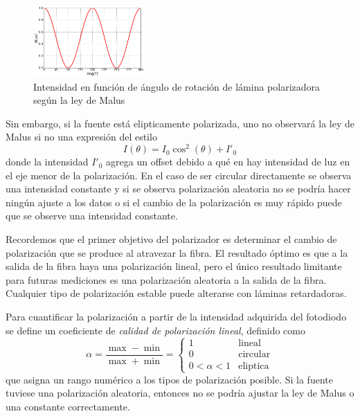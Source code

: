 \begin{figure}[H]
    \centering
    \includegraphics[width=0.38\textwidth]{fig/polarimetro/malus}
    \caption{Intensidad en función de ángulo de rotación de lámina polarizadora según la ley de Malus}
    \label{fig:polarizacion/malus}
\end{figure}

Sin embargo, si la fuente está elipticamente polarizada, uno no observará la ley de Malus si no una expresión del estilo \cite{goldstein_collett}
\begin{equation}
    I(\theta) = I_0 \cos^2(\theta) + I'_0
\end{equation}
donde la intensidad $I'_0$ agrega un offset debido a qué en hay intensidad de luz en el eje menor de la polarización. En el caso de ser circular directamente se observa una intensidad constante y si se observa polarización aleatoria no se podría hacer ningún ajuste a los datos o si el cambio de la polarización es muy rápido puede que se observe una intensidad constante.

Recordemos que el primer objetivo del polarizador es determinar el cambio de polarización que se produce al atravezar la fibra. El resultado óptimo es que a la salida de la fibra haya una polarización lineal, pero el único resultado limitante para futuras mediciones es una polarización aleatoria a la salida de la fibra. Cualquier tipo de polarización estable puede alterarse con láminas retardadoras. 

Para cuantificar la polarización a partir de la intensidad adquirida del fotodiodo se define un coeficiente de \emph{calidad de polarización lineal}, definido como
\begin{equation}
    \alpha = \frac{\max - \min}{\max + \min} = \begin{cases} 1 & \text{lineal} \\ 0 & \text{circular} \\ 0 < \alpha < 1 & \text{eliptica} \end{cases}
    \label{eq:polarizacion/alpha}
\end{equation}
que asigna un rango numérico a los tipos de polarización posible. Si la fuente tuviese una polarización aleatoria, entonces no se podría ajustar la ley de Malus o una constante correctamente.

